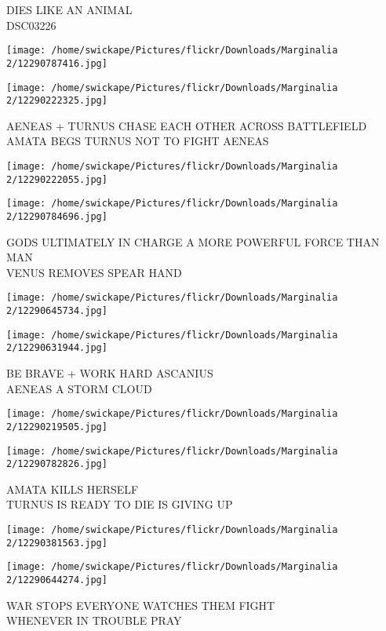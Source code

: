 \documentclass[10pt,letterpaper]{article}
\begin{document}
DIES LIKE AN ANIMAL\\
DSC03226
\pagebreak

\texttt{[image: /home/swickape/Pictures/flickr/Downloads/Marginalia 2/12290787416.jpg]}

\vspace{0.25in}
\texttt{[image: /home/swickape/Pictures/flickr/Downloads/Marginalia 2/12290222325.jpg]}

AENEAS + TURNUS CHASE EACH OTHER ACROSS BATTLEFIELD\\
AMATA BEGS TURNUS NOT TO FIGHT AENEAS
\pagebreak

\texttt{[image: /home/swickape/Pictures/flickr/Downloads/Marginalia 2/12290222055.jpg]}

\vspace{0.25in}
\texttt{[image: /home/swickape/Pictures/flickr/Downloads/Marginalia 2/12290784696.jpg]}

GODS ULTIMATELY IN CHARGE A MORE POWERFUL FORCE THAN MAN\\
VENUS REMOVES SPEAR HAND
\pagebreak

\texttt{[image: /home/swickape/Pictures/flickr/Downloads/Marginalia 2/12290645734.jpg]}

\vspace{0.25in}
\texttt{[image: /home/swickape/Pictures/flickr/Downloads/Marginalia 2/12290631944.jpg]}

BE BRAVE + WORK HARD ASCANIUS\\
AENEAS A STORM CLOUD
\pagebreak

\texttt{[image: /home/swickape/Pictures/flickr/Downloads/Marginalia 2/12290219505.jpg]}

\vspace{0.25in}
\texttt{[image: /home/swickape/Pictures/flickr/Downloads/Marginalia 2/12290782826.jpg]}

AMATA KILLS HERSELF\\
TURNUS IS READY TO DIE IS GIVING UP
\pagebreak

\texttt{[image: /home/swickape/Pictures/flickr/Downloads/Marginalia 2/12290381563.jpg]}

\vspace{0.25in}
\texttt{[image: /home/swickape/Pictures/flickr/Downloads/Marginalia 2/12290644274.jpg]}

WAR STOPS EVERYONE WATCHES THEM FIGHT\\
WHENEVER IN TROUBLE PRAY
\pagebreak
\end{document}
